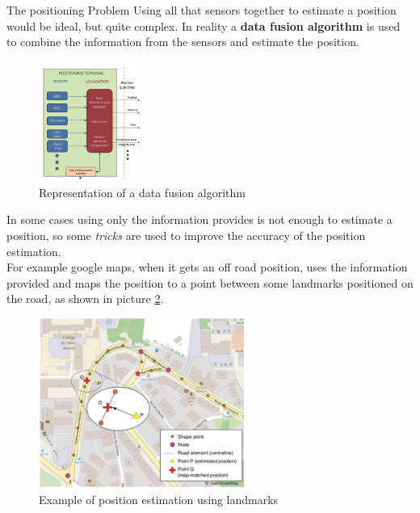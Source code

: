 \begin{section}{The positioning Problem}
    Using all that sensors together to estimate a position would be ideal, but quite complex.
    In reality a \textbf{data fusion algorithm} is used to combine the information from the sensors
    and estimate the position.\\
    \begin{figure}[h]
      \centering
      \includegraphics[width=0.3\textwidth]{img/wireless/data fusion algorithms.png}
      \caption{Representation of a data fusion algorithm}
      \label{fig:GNSS data fusion}
    \end{figure}
    In some cases using only the information provides is not enough to estimate a position, so
    some \textit{tricks} are used to improve the accuracy of the position estimation.\\
    For example google maps, when it gets an off road position, uses the information provided and
    maps the position to a point between some landmarks positioned on the road, as shown in picture
    \ref{fig:maps example}.\\

    \begin{figure}[h]
      \centering
      \includegraphics[width=0.6\textwidth]{img/wireless/maps example.png}
      \caption{Example of position estimation using landmarks}
      \label{fig:maps example}
    \end{figure}
  \end{section}


